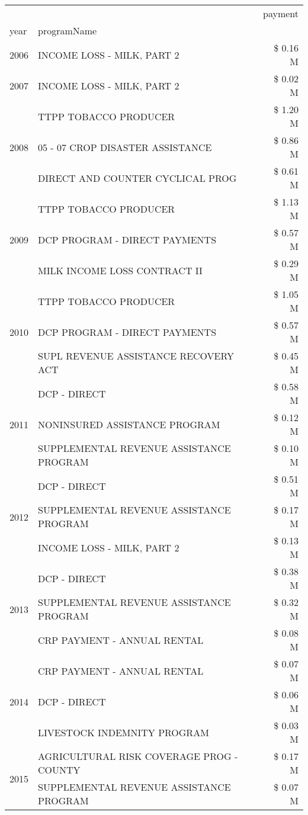 \begin{tabular}{llr}
\toprule
 &  & payment \\
year & programName &  \\
\midrule
2006 & INCOME LOSS - MILK, PART 2 & \$ 0.16 M \\
\cline{1-3}
2007 & INCOME LOSS - MILK, PART 2 & \$ 0.02 M \\
\cline{1-3}
\multirow[t]{3}{*}{2008} & TTPP TOBACCO PRODUCER & \$ 1.20 M \\
 & 05 - 07 CROP DISASTER ASSISTANCE & \$ 0.86 M \\
 & DIRECT AND COUNTER CYCLICAL PROG & \$ 0.61 M \\
\cline{1-3}
\multirow[t]{3}{*}{2009} & TTPP TOBACCO PRODUCER & \$ 1.13 M \\
 & DCP PROGRAM - DIRECT PAYMENTS & \$ 0.57 M \\
 & MILK INCOME LOSS CONTRACT II & \$ 0.29 M \\
\cline{1-3}
\multirow[t]{3}{*}{2010} & TTPP TOBACCO PRODUCER & \$ 1.05 M \\
 & DCP PROGRAM - DIRECT PAYMENTS & \$ 0.57 M \\
 & SUPL REVENUE ASSISTANCE RECOVERY ACT & \$ 0.45 M \\
\cline{1-3}
\multirow[t]{3}{*}{2011} & DCP - DIRECT & \$ 0.58 M \\
 & NONINSURED ASSISTANCE PROGRAM & \$ 0.12 M \\
 & SUPPLEMENTAL REVENUE ASSISTANCE PROGRAM & \$ 0.10 M \\
\cline{1-3}
\multirow[t]{3}{*}{2012} & DCP - DIRECT & \$ 0.51 M \\
 & SUPPLEMENTAL REVENUE ASSISTANCE PROGRAM & \$ 0.17 M \\
 & INCOME LOSS - MILK, PART 2 & \$ 0.13 M \\
\cline{1-3}
\multirow[t]{3}{*}{2013} & DCP - DIRECT & \$ 0.38 M \\
 & SUPPLEMENTAL REVENUE ASSISTANCE PROGRAM & \$ 0.32 M \\
 & CRP PAYMENT - ANNUAL RENTAL & \$ 0.08 M \\
\cline{1-3}
\multirow[t]{3}{*}{2014} & CRP PAYMENT - ANNUAL RENTAL & \$ 0.07 M \\
 & DCP - DIRECT & \$ 0.06 M \\
 & LIVESTOCK INDEMNITY PROGRAM & \$ 0.03 M \\
\cline{1-3}
\multirow[t]{3}{*}{2015} & AGRICULTURAL RISK COVERAGE PROG - COUNTY & \$ 0.17 M \\
 & SUPPLEMENTAL REVENUE ASSISTANCE PROGRAM & \$ 0.07 M \\

\end{tabular}
